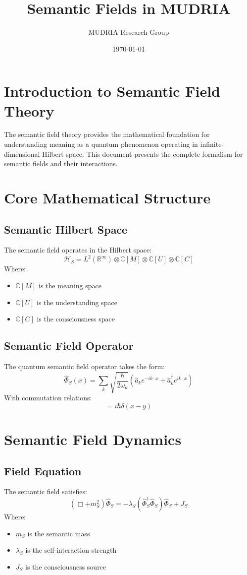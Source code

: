 \documentclass[12pt]{article}
\title{Semantic Fields in MUDRIA}
\author{MUDRIA Research Group}
\date{\today}
\begin{document}
\maketitle
\section{Introduction to Semantic Field Theory}
The semantic field theory provides the mathematical foundation for understanding meaning as a quantum phenomenon operating in infinite-dimensional Hilbert space. This document presents the complete formalism for semantic fields and their interactions.
\section{Core Mathematical Structure}
\subsection{Semantic Hilbert Space}
The semantic field operates in the Hilbert space:
\begin{equation}
\mathcal{H}_S = L^2(\mathbb{R}^\infty) \otimes \mathbb{C}[M] \otimes \mathbb{C}[U] \otimes \mathbb{C}[C]
\end{equation}
Where:
\begin{itemize}
\item $\mathbb{C}[M]$ is the meaning space
\item $\mathbb{C}[U]$ is the understanding space
\item $\mathbb{C}[C]$ is the consciousness space
\end{itemize}
\subsection{Semantic Field Operator}
The quantum semantic field operator takes the form:
\begin{equation}
\hat{\Phi}_S(x) = \sum_k \sqrt{\frac{\hbar}{2\omega_k}}(\hat{a}_k e^{-ik\cdot x} + \hat{a}_k^\dagger e^{ik\cdot x})
\end{equation}
With commutation relations:
\begin{equation}
[\hat{\Phi}_S(x),\hat{\Pi}_S(y)] = i\hbar\delta(x-y)
\end{equation}
\section{Semantic Field Dynamics}
\subsection{Field Equation}
The semantic field satisfies:
\begin{equation}
(\Box + m_S^2)\hat{\Phi}_S = -\lambda_S(\hat{\Phi}_S^\dagger\hat{\Phi}_S)\hat{\Phi}_S + J_S
\end{equation}
Where:
\begin{itemize}
\item $m_S$ is the semantic mass
\item $\lambda_S$ is the self-interaction strength
\item $J_S$ is the consciousness source
\end{itemize}
\end{document}
